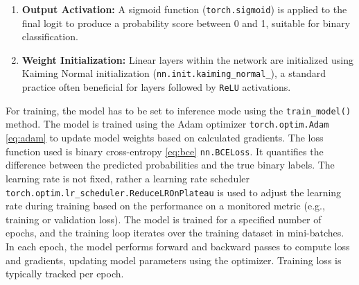 \begin{enumerate}
  \item \textbf{Output Activation:} A sigmoid function (\texttt{torch.sigmoid}) is applied to the final logit to produce a probability score between 0 and 1, suitable for binary classification.

  \item \textbf{Weight Initialization:} Linear layers within the network are initialized using Kaiming Normal initialization (\texttt{nn.init.kaiming\_normal\_}), a standard practice often beneficial for layers followed by \texttt{ReLU} activations.
\end{enumerate}

For training, the model has to be set to inference mode using the \texttt{train\_model()} method. The model is trained using the Adam optimizer \texttt{torch.optim.Adam} \autoref{eq:adam} \autocite{kingma2014adam} to update model weights based on calculated gradients. The loss function used is binary cross-entropy \autoref{eq:bce} \texttt{nn.BCELoss}. It quantifies the difference between the predicted probabilities and the true binary labels. The learning rate is not fixed, rather a learning rate scheduler \texttt{torch.optim.lr\_scheduler.ReduceLROnPlateau} is used to adjust the learning rate during training based on the performance on a monitored metric (e.g., training or validation loss). The model is trained for a specified number of epochs, and the training loop iterates over the training dataset in mini-batches. In each epoch, the model performs forward and backward passes to compute loss and gradients, updating model parameters using the optimizer. Training loss is typically tracked per epoch.

